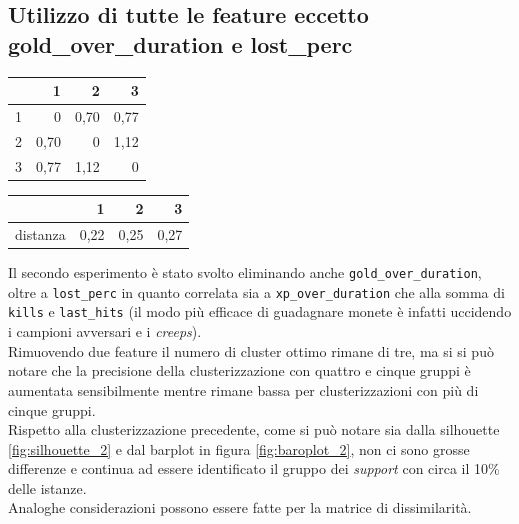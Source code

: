 \documentclass[a4paper,12pt,openany,oneside]{book}
\begin{document}
\subsection{Utilizzo di tutte le feature eccetto gold\_over\_duration e lost\_perc}
\begin{table}[!h]
	\scriptsize	
	\centering	
	\begin{tabularx}{0.22\textwidth}{r | rrr} 
		& 1    & 2    & 3    \\
		\midrule
		1 & 0    & 0,70 & 0,77 \\
		2 & 0,70 & 0    & 1,12 \\
		3 & 0,77 & 1,12 & 0    \\
	\end{tabularx}
	\hspace{6em}
	\begin{tabularx}{0.27\textwidth}{r | rrr} 
         & 1    & 2    & 3    \\
         \midrule
         distanza & 0,22 & 0,25 & 0,27 \\
	\end{tabularx}
\end{table}
Il secondo esperimento è stato svolto eliminando anche \verb|gold_over_duration|, oltre a \verb|lost_perc| in quanto correlata sia a \verb|xp_over_duration| che alla somma di \verb|kills| e \verb|last_hits| (il modo più efficace di guadagnare monete è infatti uccidendo i campioni avversari e i \textit{creeps}).\\
Rimuovendo due feature il numero di cluster ottimo rimane di tre, ma si si può notare che la precisione della clusterizzazione con quattro e cinque gruppi è aumentata sensibilmente mentre rimane bassa per clusterizzazioni con più di cinque gruppi.\\
Rispetto alla clusterizzazione precedente, come si può notare sia dalla silhouette \ref{fig:silhouette_2} e dal barplot in figura \ref{fig:baroplot_2}, non ci sono grosse differenze e continua ad essere identificato il gruppo dei \textit{support} con circa il 10\% delle istanze.\\
Analoghe considerazioni possono essere fatte per la matrice di dissimilarità.
\end{document}
